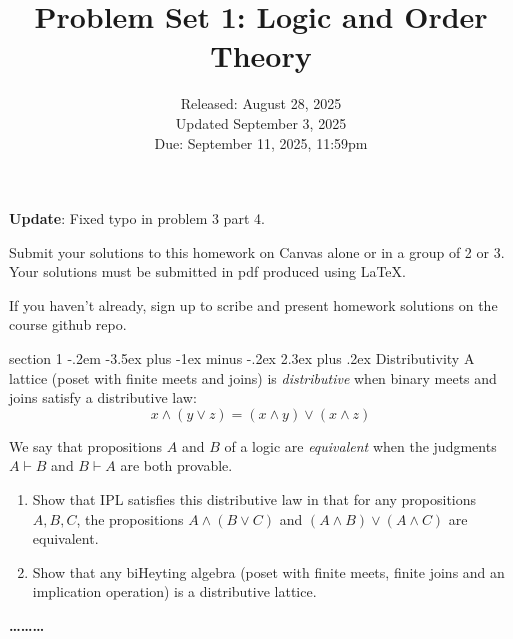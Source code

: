 \documentclass[12pt]{article}
\makeatletter
\newenvironment{problem}{\@startsection
       {section}
       {1}
       {-.2em}
       {-3.5ex plus -1ex minus -.2ex}
       {2.3ex plus .2ex}
       {\pagebreak[3]%
       \large\bf\noindent{Problem }
       }
       }
       {%
       \begin{center}\large\bf \ldots\ldots\ldots\end{center}}
\makeatother
\begin{document}
\title{Problem Set 1: Logic and Order Theory}
\date{Released: August 28, 2025\\ Updated September 3, 2025\\ Due: September 11, 2025, 11:59pm}
\maketitle

\textbf{Update}: Fixed typo in problem 3 part 4.

Submit your solutions to this homework on Canvas alone or in a group of 2 or
3. Your solutions must be submitted in pdf produced using LaTeX.

If you haven't already, sign up to scribe and present homework
solutions on the course github repo.



\begin{problem}{Distributivity}
  A lattice (poset with finite meets and joins) is \emph{distributive}
  when binary meets and joins satisfy a distributive law:
  \[ x \wedge (y \vee z) = (x \wedge y) \vee (x \wedge z) \]

  We say that propositions $A$ and $B$ of a logic are
  \emph{equivalent} when the judgments $A \vdash B$ and $B \vdash A$
  are both provable.

  \begin{enumerate}
  \item Show that IPL satisfies this distributive law in that for any
    propositions $A, B, C$, the propositions $A \wedge (B \vee C)$ and
    $(A \wedge B) \vee (A \wedge C)$ are equivalent.
  \item Show that any biHeyting algebra (poset with finite meets, finite joins
    and an implication operation) is a distributive lattice.
  \end{enumerate}
\end{problem}
\end{document}
